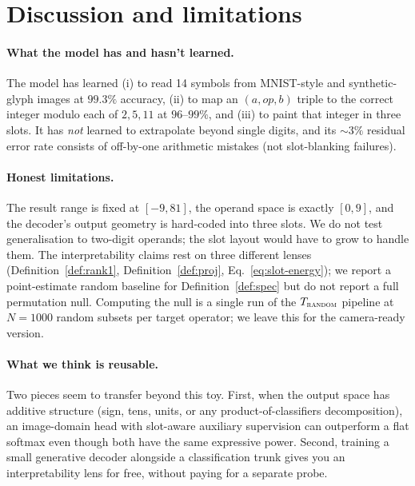 \documentclass[11pt]{article}
\theoremstyle{papsty}
\begin{document}
\section{Discussion and limitations}

\paragraph{What the model has and hasn't learned.}
The model has learned (i) to read 14 symbols from MNIST-style and
synthetic-glyph images at $99.3\%$ accuracy, (ii) to map an
$(a, op, b)$ triple to the correct integer modulo each of $2, 5, 11$ at
$96$--$99\%$, and (iii) to paint that integer in three slots. It has
\emph{not} learned to extrapolate beyond single digits, and its
$\sim 3\%$ residual error rate consists of off-by-one arithmetic
mistakes (not slot-blanking failures).

\paragraph{Honest limitations.}
The result range is fixed at $[-9, 81]$, the operand space is exactly
$[0, 9]$, and the decoder's output geometry is hard-coded into three
slots. We do not test generalisation to two-digit operands; the slot
layout would have to grow to handle them. The interpretability claims
rest on three different lenses (Definition~\ref{def:rank1},
Definition~\ref{def:proj}, Eq.~\ref{eq:slot-energy}); we report a
point-estimate random baseline for Definition~\ref{def:spec} but do not
report a full permutation null. Computing the null is a single run of
the $T_{\textsc{random}}$ pipeline at $N = 1000$ random subsets per
target operator; we leave this for the camera-ready version.

\paragraph{What we think is reusable.}
Two pieces seem to transfer beyond this toy. First, when the output
space has additive structure (sign, tens, units, or any
product-of-classifiers decomposition), an image-domain head with
slot-aware auxiliary supervision can outperform a flat softmax even
though both have the same expressive power. Second, training a small
generative decoder alongside a classification trunk gives you an
interpretability lens for free, without paying for a separate probe.
\end{document}
